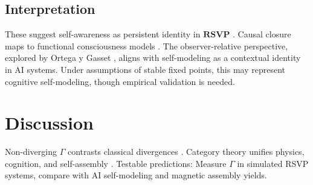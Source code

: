 \documentclass{article}
\theoremstyle{plain}
\theoremstyle{definition}
\begin{document}
\subsection{Interpretation}
These suggest self-awareness as persistent identity in $\mathbf{RSVP}$ \cite{Bennett2025}. Causal closure maps to functional consciousness models \cite{Pearl2009,Goguen1992}. The observer-relative perspective, explored by Ortega y Gasset \cite{Ortega1931}, aligns with self-modeling as a contextual identity in AI systems. Under assumptions of stable fixed points, this may represent cognitive self-modeling, though empirical validation is needed.

\section{Discussion}

Non-diverging $\Gamma$ contrasts classical divergences \cite{Soares2023}. Category theory unifies physics, cognition, and self-assembly \cite{Spivak2014,Goguen1992,Liang2025}. Testable predictions: Measure $\Gamma$ in simulated RSVP systems, compare with AI self-modeling and magnetic assembly yields.
\end{document}
